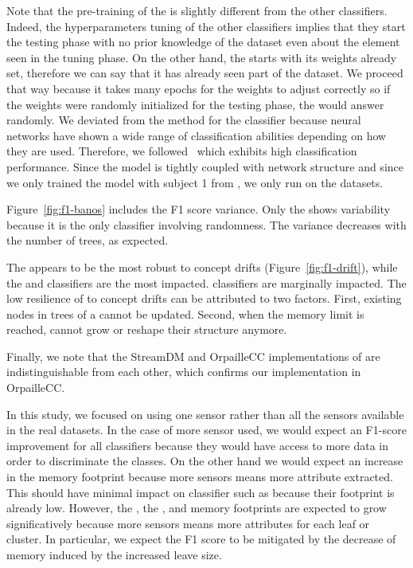 Note that the pre-training of the \FNN is slightly different from the other
classifiers. Indeed, the hyperparameters tuning of the other classifiers implies
that they start the testing phase with no prior knowledge of the dataset even
about the element seen in the tuning phase. On the other hand, the \FNN starts
with its weights already set, therefore we can say that it has already seen part
of the dataset. We proceed that way because it takes many epochs for the weights
to adjust correctly so if the weights were randomly initialized for the testing
phase, the \FNN would answer randomly.  We deviated from the method for the \FNN
classifier because neural networks have shown a wide range of classification
abilities depending on how they are used.  Therefore, we
followed~\cite{omid_2019} which exhibits high classification performance. Since
the \FNN model is tightly coupled with network structure and since we only
trained the model with subject 1 from \banosdataset, we only run \FNN on the
\banosdataset datasets.

Figure~\ref{fig:f1-banos} includes the F1 score variance. Only the
\mondrianforest shows variability because it is the only classifier involving
randomness. The variance decreases with the number of trees, as expected.

The \hoeffdingtree appears to be the most robust to concept drifts
(Figure~\ref{fig:f1-drift}), while the \mondrianforest and \naivebayes
classifiers are the most impacted. \mcnn classifiers are marginally impacted.
The low resilience of \mondrianforest to concept drifts can be attributed to
two factors. First, existing nodes in trees of a \mondrianforest cannot be updated.
Second, when the memory limit is reached, \mondrianforest cannot grow
or reshape their structure anymore.

Finally, we note that the StreamDM and OrpailleCC implementations of
\naivebayes are indistinguishable from each other, which confirms our
implementation in OrpailleCC.

In this study, we focused on using one sensor rather than all the sensors
available in the real datasets. In the case of more sensor used, we would expect
an F1-score improvement for all classifiers because they would have access to
more data in order to discriminate the classes. On the other hand we would
expect an increase in the memory footprint because more sensors means more
attribute extracted. This should have minimal impact on classifier such as
\naivebayes because their footprint is already low. However, the
\mondrianforest, the \hoeffdingtree, and \mcnn memory footprints are expected to
grow significatively because more sensors means more attributes for each leaf or
cluster. In particular, we expect the \mondrianforest F1 score to be mitigated
by the decrease of memory induced by the increased leave size.


